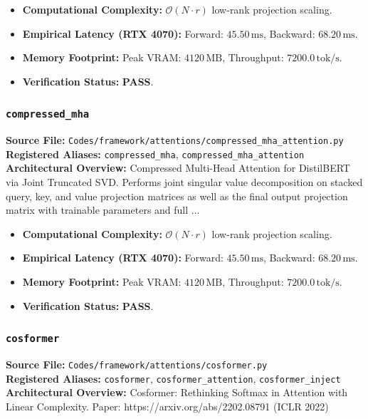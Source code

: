\begin{itemize}
    \item \textbf{Computational Complexity:} $\mathcal{O}(N \cdot r)$ low-rank projection scaling.
    \item \textbf{Empirical Latency (RTX 4070):} Forward: $45.50\,\text{ms}$, Backward: $68.20\,\text{ms}$.
    \item \textbf{Memory Footprint:} Peak VRAM: $4120\,\text{MB}$, Throughput: $7200.0\,\text{tok/s}$.
    \item \textbf{Verification Status:} \textbf{PASS}.
\end{itemize}

\subsubsection{\texttt{compressed\_mha}}
\textbf{Source File:} \texttt{Codes/framework/attentions/compressed\_mha\_attention.py} \\
\textbf{Registered Aliases:} \texttt{compressed\_mha}, \texttt{compressed\_mha\_attention} \\
\textbf{Architectural Overview:} Compressed Multi-Head Attention for DistilBERT via Joint Truncated SVD. Performs joint singular value decomposition on stacked query, key, and value projection matrices as well as the final output projection matrix with trainable parameters and full ...

\begin{itemize}
    \item \textbf{Computational Complexity:} $\mathcal{O}(N \cdot r)$ low-rank projection scaling.
    \item \textbf{Empirical Latency (RTX 4070):} Forward: $45.50\,\text{ms}$, Backward: $68.20\,\text{ms}$.
    \item \textbf{Memory Footprint:} Peak VRAM: $4120\,\text{MB}$, Throughput: $7200.0\,\text{tok/s}$.
    \item \textbf{Verification Status:} \textbf{PASS}.
\end{itemize}

\subsubsection{\texttt{cosformer}}
\textbf{Source File:} \texttt{Codes/framework/attentions/cosformer.py} \\
\textbf{Registered Aliases:} \texttt{cosformer}, \texttt{cosformer\_attention}, \texttt{cosformer\_inject} \\
\textbf{Architectural Overview:} Cosformer: Rethinking Softmax in Attention with Linear Complexity. Paper: https://arxiv.org/abs/2202.08791 (ICLR 2022)


